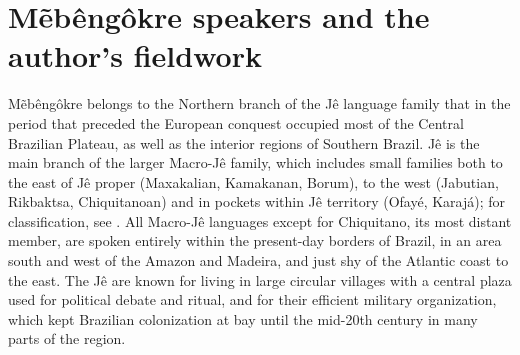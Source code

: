 \documentclass[output=paper]{langscibook}
\begin{document}

\section{Mẽbêngôkre speakers and the author's fieldwork}

Mẽbêngôkre belongs to the Northern branch of the Jê language family that in the period that preceded the European conquest occupied most of the Central Brazilian Plateau, as well as the interior regions of Southern Brazil. Jê is the main branch of the larger Macro-Jê family, which includes small families both to the east of Jê proper (Maxakalian, Kamakanan, Borum), to the west (Jabutian, Rikbaktsa, Chiquitanoan) and in pockets within Jê territory (Ofayé, Karajá); for classification, see \citet{nikulin:phd}. All Macro-Jê languages except for Chiquitano, its most distant member, are spoken entirely within the present-day borders of Brazil, in an area south and west of the Amazon and Madeira, and just shy of the Atlantic coast to the east. The Jê are known for living in large circular villages with a central plaza used for political debate and ritual, and for their efficient military organization, which kept Brazilian colonization at bay until the mid-20th century in many parts of the region.
\end{document}
